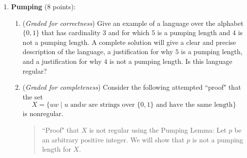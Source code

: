 \documentclass[12pt, oneside]{article}
\newcommand{\gradeCorrect}{({\it Graded for correctness}) }
\newcommand{\gradeComplete}{({\it Graded for completeness}) }
\begin{document}
\begin{enumerate}[wide, labelwidth=!, labelindent=0pt]
\begin{enumerate}
\item\gradeCorrect Illustrate this construction by defining a specific example NFA $N$ and applying the 
construction above to create a new NFA. Your example NFA should
\begin{itemize}
    \item Have exactly three states (all reachable from the start state),
    \item Have at least one spontaneous move (arrow labelled $\varepsilon$),
    \item Accept at least one string and reject at least one string, and
    \item Not have any states labelled $q_0$.
\end{itemize}
Apply the construction above to create the new NFA. A complete submission 
will include the state diagram of your example NFA $N$ and the state diagram of the NFA resulting 
from this construction.
\item\gradeCorrect Use Theorem 1.39 on page 55 of the book (see also page 7 in Week 3 notes) to construct a 
DFA equivalent to your example NFA $N$ from part (a).
A complete submission 
will include the state diagram of your example NFA $N$ and the state diagram of the DFA resulting 
from this construction, with the correct state labels for this DFA. You may prune the DFA so that only the ``macro-states''
reachable from the start state are included.
\item \gradeComplete Explain the relationship between $N_1$ and $N_2$ in the general construction.
Give an example string that is accepted by your example NFA $N$ and is rejected by the NFA that results from 
applying the general construction that illustrates this relationship, or explain why there is no such example string.

\end{enumerate}


\item \textbf{Pumping} (8 points):

\begin{enumerate}
\item\gradeCorrect Give an example of a language
over the alphabet $\{0,1\}$ that has cardinality $3$ and for which $5$ is a pumping length
and $4$ is not a pumping length.  A complete solution will give a clear and precise
description of the language, a justification for why $5$ is a pumping length, and a 
justification for why $4$ is not a pumping length. Is this language regular?
\item\gradeComplete Consider the following attempted ``proof" that the set 
$$X = \{ uw \mid \text{$u$ and
$w$ are strings over $\{0,1\}$ and have the same length} \}$$
is nonregular.
\begin{quote}
``Proof" that $X$ is not regular using the Pumping Lemma: Let $p$ be 
an arbitrary positive integer. We will show that $p$ is not a pumping length for $X$. 


\end{quote}
\end{enumerate}
\end{enumerate}
\end{document}
